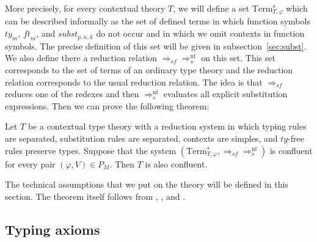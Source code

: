 \documentclass[reqno]{amsart}
\theoremstyle{definition}
\theoremstyle{remark}
\newcommand{\nf}{\mathrm{nf}}
\newcommand{\Term}{\mathrm{Term}}
\newcommand{\subst}{\mathit{subst}}
\newcommand{\ft}{\mathit{ft}}
\newcommand{\ty}{\mathit{ty}}
\numberwithin{figure}{section}
\begin{document}
More precisely, for every contextual theory $T$, we will define a set $\Term_{T,\varphi}^s$ which can be described informally as the set of defined terms
in which function symbols $\ty_m$, $\ft_m$, and $\subst_{p,n,k}$ do not occur and in which we omit contexts in function symbols.
The precise definition of this set will be given in subsection~\ref{sec:subst}.
We also define there a reduction relation $\Rightarrow_{sf} \Rightarrow_s^\nf$ on this set.
This set corresponds to the set of terms of an ordinary type theory and the reduction relation corresponds to the usual reduction relation.
The idea is that $\Rightarrow_{sf}$ reduces one of the redexes and then $\Rightarrow_s^\nf$ evaluates all explicit substitution expressions.
Then we can prove the following theorem:

\begin{thm}
Let $T$ be a contextual type theory with a reduction system in which typing rules are separated, substitution rules are separated, contexts are simples, and $\ty$-free rules preserve types.
Suppose that the system $(\Term_{T,\varphi}^s, \Rightarrow_{sf} \Rightarrow_s^\nf)$ is confluent for every pair $(\varphi,V) \in P_M$.
Then $T$ is also confluent.
\end{thm}

The technical assumptions that we put on the theory will be defined in this section.
The theorem itself follows from , , and .

\subsection{Typing axioms}
\end{document}
